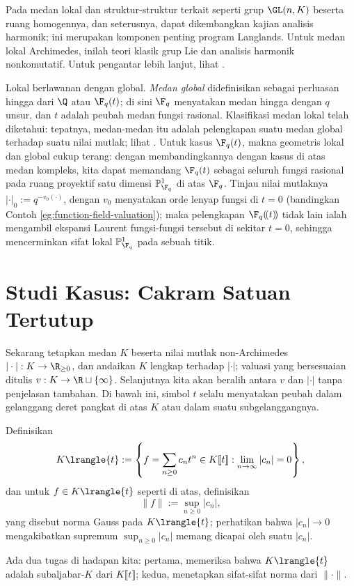 Pada medan lokal dan struktur-struktur terkait seperti grup $\GL(n,K)$ beserta ruang homogennya, dan seterusnya, dapat dikembangkan kajian analisis harmonik; ini merupakan komponen penting program Langlands. Untuk medan lokal Archimedes, inilah teori klasik grup Lie dan analisis harmonik nonkomutatif. Untuk pengantar lebih lanjut, lihat \cite{FL14}.

Lokal berlawanan dengan global. \emph{Medan global} didefinisikan sebagai perluasan hingga dari $\Q$ atau $\F_q(t)$; di sini $\F_q$ menyatakan medan hingga dengan $q$ unsur, dan $t$ adalah peubah medan fungsi rasional. Klasifikasi medan lokal telah diketahui: tepatnya, medan-medan itu adalah pelengkapan suatu medan global terhadap suatu nilai mutlak; lihat \cite[II. (5.2)]{Neu99}. Untuk kasus $\F_q(t)$, makna geometris lokal dan global cukup terang: dengan membandingkannya dengan kasus di atas medan kompleks, kita dapat memandang $\F_q(t)$ sebagai seluruh fungsi rasional pada ruang proyektif satu dimensi $\mathbb{P}^1_{\F_q}$ di atas $\F_q$. Tinjau nilai mutlaknya $|\cdot|_0 := q^{-v_0(\cdot)}$, dengan $v_0$ menyatakan orde lenyap fungsi di $t=0$ (bandingkan Contoh \ref{eg:function-field-valuation}); maka pelengkapan $\F_q(\!(t)\!)$ tidak lain ialah mengambil ekspansi Laurent fungsi-fungsi tersebut di sekitar $t=0$, sehingga mencerminkan sifat lokal $\mathbb{P}^1_{\F_q}$ pada sebuah titik. 

\section{Studi Kasus: Cakram Satuan Tertutup}\label{sec:closed-unit-disc}
Sekarang tetapkan medan $K$ beserta nilai mutlak non-Archimedes $|\cdot|: K \to \R_{\geq 0}$, dan andaikan $K$ lengkap terhadap $|\cdot|$; valuasi yang bersesuaian ditulis $v: K \to \R \sqcup \{\infty\}$. Selanjutnya kita akan beralih antara $v$ dan $|\cdot|$ tanpa penjelasan tambahan. Di bawah ini, simbol $t$ selalu menyatakan peubah dalam gelanggang deret pangkat di atas $K$ atau dalam suatu subgelanggangnya.

\begin{definition}\label{def:strictly-convergent-series}
	Definisikan
	\[ K\lrangle{t} := \left\{ f = \sum_{n \geq 0} c_n t^n \in K\llbracket t\rrbracket : \lim_{n \to \infty}|c_n| = 0 \right\},  \]
	dan untuk $f \in K\lrangle{t}$ seperti di atas, definisikan
	\[ \|f\| := \sup_{n \geq 0} |c_n|, \]
	yang disebut norma Gauss pada $K\lrangle{t}$; perhatikan bahwa $|c_n| \to 0$ mengakibatkan supremum $\sup_{n \geq 0} |c_n|$ memang dicapai oleh suatu $|c_n|$. 
\end{definition}
Ada dua tugas di hadapan kita: pertama, memeriksa bahwa $K\lrangle{t}$ adalah subaljabar-$K$ dari $K\llbracket t\rrbracket$; kedua, menetapkan sifat-sifat norma dari $\|\cdot\|$.

